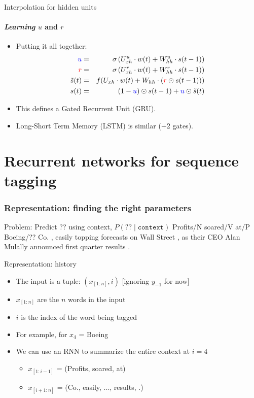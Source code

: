 \begin{frame}{Interpolation for hidden units}
\framesubtitle{{\it Learning} $u$ and $r$}
\begin{itemize}[<+->]
	\item Putting it all together:
	\begin{eqnarray*}
		\textcolor{blue}{u} &=& \sigma\left( U^u_{xh} \cdot w(t) + W^u_{hh} \cdot s(t-1) \right)  \\
		\textcolor{red}{r} &=& \sigma\left( U^r_{xh} \cdot w(t) + W^r_{hh} \cdot s(t-1) \right) \\
		\tilde{s}(t) &=& f(U_{xh} \cdot w(t) + W_{hh} \cdot \left( \textcolor{red}{r} \odot s(t-1) \right) ) \\
		s(t) &=& (1-\textcolor{blue}{u}) \odot s(t-1) + \textcolor{blue}{u} \odot \tilde{s}(t)
	\end{eqnarray*}
	\item This defines a Gated Recurrent Unit (GRU). 
	\item Long-Short Term Memory (LSTM) is similar (+2 gates).
\end{itemize}
\end{frame}

\newcommand{\postag}[1]{{\color{red}/#1}}
\newcommand{\nertag}[1]{{\color{blue}/#1}}

\section{Recurrent networks for sequence tagging}

\begin{frame}
\frametitle{Representation: finding the right parameters}
\begin{block}{Problem: Predict ?? using context, $P(?? \mid \texttt{context})$ }
Profits\postag{N} soared\postag{V} at\postag{P} Boeing\postag{??} Co. , easily topping forecasts on Wall Street , as their CEO Alan Mulally announced first quarter results .
\end{block}
\pause
\begin{block}{Representation: history}
\begin{itemize}
\item The input is a tuple: $(x_{[1:n]}, i)$ [ignoring $y_{-1}$ for now]
\item $x_{[1:n]}$ are the $n$ words in the input
\item $i$ is the index of the word being tagged
\item For example, for $x_4$ = Boeing
\item We can use an RNN to summarize the entire context at $i=4$
    \begin{itemize}
    \item $x_{[1:i-1]}$ = (Profits, soared, at)
    \item $x_{[i+1:n]}$ = (Co., easily, ..., results, .)
    \end{itemize}
\end{itemize}
\end{block}
\end{frame}

